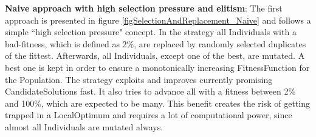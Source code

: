 \textbf{Naive approach with high selection pressure and elitism}: The first approach is presented in figure \ref{figSelectionAndReplacement_Naive} and follows a simple ``high selection pressure" concept. In the strategy all \glspl{Individual} with a bad-fitness, which is defined as 2\%, are replaced by randomly selected duplicates of the fittest. Afterwards, all \glspl{Individual}, except one of the best, are mutated. A best one is kept in order to ensure a monotonically increasing \gls{FitnessFunction} for the \gls{Population}. The strategy exploits and improves currently promising \glspl{CandidateSolution} fast. It also tries to advance all with a fitness between 2\% and 100\%, which are expected to be many. This benefit creates the risk of getting trapped in a \gls{LocalOptimum} and requires a lot of computational power, since almost all \glspl{Individual} are mutated always. %

